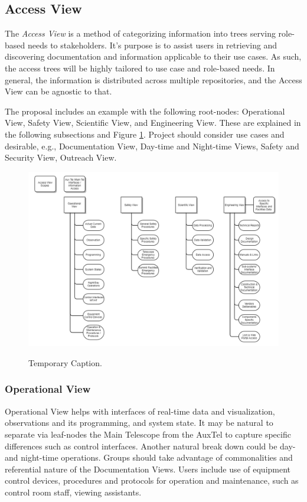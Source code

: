 \subsection{Access View}
\label{sec:access-view}

The \emph{Access View} is a method of categorizing information into trees serving role-based needs to stakeholders.
It's purpose is to assist users in retrieving and discovering documentation and information applicable to their use cases.
As such, the access trees will be highly tailored to use case and role-based needs.
In general, the information is distributed across multiple repositories, and the Access View can be agnostic to that.

The proposal includes an example with the following root-nodes: Operational View, Safety View, Scientific View, and Engineering View.
These are explained in the following subsections and Figure \ref{fig:access-view-example}.
Project should consider use cases and desirable, e.g., Documentation View, Day-time and Night-time Views, Safety and Security View, Outreach View.

\begin{figure}[ht]
\caption{Temporary Caption.}
\centering
\includegraphics[width=\textwidth]{access-view-example-temp}
\label{fig:access-view-example}
\end{figure}

\subsubsection{Operational View}

Operational View helps with interfaces of real-time data and visualization, observations and its programming, and system state.
It may be natural to separate via leaf-nodes the Main Telescope from the AuxTel to capture specific differences such as control interfaces.
Another natural break down could be day- and night-time operations.
Groups should take advantage of commonalities and referential nature of the Documentation Views.
Users include use of equipment control devices, procedures and protocols for operation and maintenance, such as control room staff, viewing assistants.

